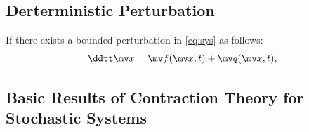 \subsection{Derterministic Perturbation}

If there exists a bounded perturbation in \eqref{eq:sys} as follows:
\begin{equation}
    \ddtt\bdx
    =
    \bdf(\bdx,t)
    +
    \bdq(\bdx,t)
    ,
\end{equation}

\cite{Wang:2004aa,Jouffroy:2004aa}

\subsection{Basic Results of Contraction Theory for Stochastic Systems}
